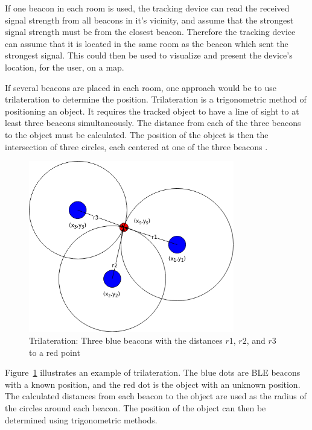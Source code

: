 \documentclass[../Main/thesis.tex]{subfiles}
\begin{document}
If one beacon in each room is used, the tracking device can read the received signal strength from all beacons in it's vicinity, and assume that the strongest signal strength must be from the closest beacon.
Therefore the tracking device can assume that it is located in the same room as the beacon which sent the strongest signal.
This could then be used to visualize and present the device's location, for the user, on a map.

If several beacons are placed in each room, one approach would be to use trilateration to determine the position.
Trilateration is a trigonometric method of positioning an object.
It requires the tracked object to have a line of sight to at least three beacons simultaneously.
The distance from each of the three beacons to the object must be calculated.
The position of the object is then the intersection of three circles, each centered at one of the three beacons \citep{Chawathe}.

\begin{figure}[h]
	\centering
	\includegraphics[width=0.8\textwidth]{../fig/Trilaterering}
	\caption{Trilateration: Three blue beacons with the distances $r1$, $r2$, and $r3$ to a red point}
	\label{fig:trilateration}
\end{figure}

Figure~\ref{fig:trilateration} illustrates an example of trilateration.
The blue dots are BLE beacons with a known position, and the red dot is the object with an unknown position.
The calculated distances from each beacon to the object are used as the radius of the circles around each beacon.
The position of the object can then be determined using trigonometric methods.
\end{document}
